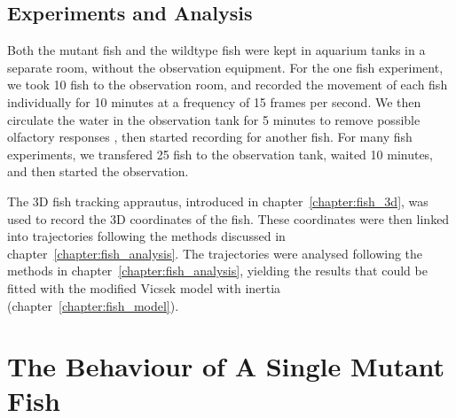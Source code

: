 \documentclass[11pt,twoside]{report}
\begin{document}
\subsection{Experiments and Analysis}

Both the mutant fish and the wildtype fish were kept in aquarium tanks in a separate room, without the observation equipment. For the one fish experiment, we took 10 fish to the observation room, and recorded the movement of each fish individually for 10 minutes at a frequency of 15 frames per second. We then circulate the water in the observation tank for 5 minutes to remove possible olfactory responses \cite{kalueff2013}, then started recording for another fish. For many fish experiments, we transfered 25 fish to the observation tank, waited 10 minutes, and then started the observation.

The 3D fish tracking apprautus, introduced in chapter~\ref{chapter:fish_3d}, was used to record the 3D coordinates of the fish.
These coordinates were then linked into trajectories following the methods discussed in chapter~\ref{chapter:fish_analysis}. The trajectories were analysed following the methods in chapter~\ref{chapter:fish_analysis}, yielding the results that could be fitted with the modified Vicsek model with inertia (chapter~\ref{chapter:fish_model}).


\section{The Behaviour of A Single Mutant Fish}
\label{section:mutant-1-fish}

\end{document}
